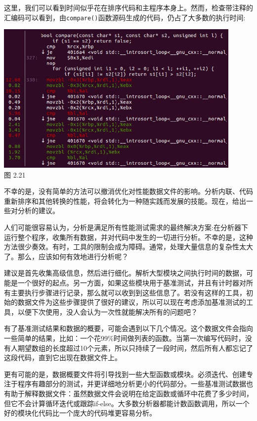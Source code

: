 这里，我们可以看到时间似乎花在排序代码和主程序本身上。然而，检查带注释的汇编码可以看到，由\texttt{compare()}函数源码生成的代码，仍占了大多数的执行时间:

\begin{center}
\includegraphics[width=0.9\textwidth]{content/1/chapter2/images/21.jpg}\\
图 2.21
\end{center}

不幸的是，没有简单的方法可以撤消优化对性能数据文件的影响。分析内联、代码重新排序和其他转换的性能，将会转化为一种随实践而发展的技能。现在，给出一些对分析的建议。


人们可能很容易认为，分析是满足所有性能测试需求的最终解决方案:在分析器下运行整个程序，收集所有数据，并对代码中发生的一切进行分析。不幸的是，这种方法很少奏效。有时，工具的限制会成为障碍。通常，处理大量信息的复杂性太大了。那么，应该如何有效地进行分析呢？

建议是首先收集高级信息，然后进行细化。解析大型模块之间执行时间的数据，可能是一个很好的起点。另一方面，如果这些模块用于基准测试，并且有计时器对所有主要执行步骤进行记录，那么就可以收到到这些信息了。若没有这样的工具，初始的数据文件为这些步骤提供了很好的建议，所以可以现在考虑添加基准测试的工具，以便下次使用，没人会认为一次性就能解决所有的问题吧？

有了基准测试结果和数据的概要，可能会遇到以下几个情况。这个数据文件会指向一些简单的结果，比如：一个花99\%时间做列表的函数。当第一次编写代码时，没有人期望数组的长度超过10个元素，所以只持续了一段时间，然后所有人都忘记了这段代码，直到它出现在数据文件上。

更有可能的是，数据概要文件将引导找到一些大型函数或模块。必须迭代、创建专注于程序有趣部分的测试，并更详细地分析更小的代码部分。一些基准测试数据也有助于解释数据文件：虽然数据文件会说明在给定函数或循环中花费了多少时间，但它不会计算循环迭代或跟踪if-else。大多数分析器都能计数函数调用，所以一个好的模块化代码比一个庞大的代码堆更容易分析。

